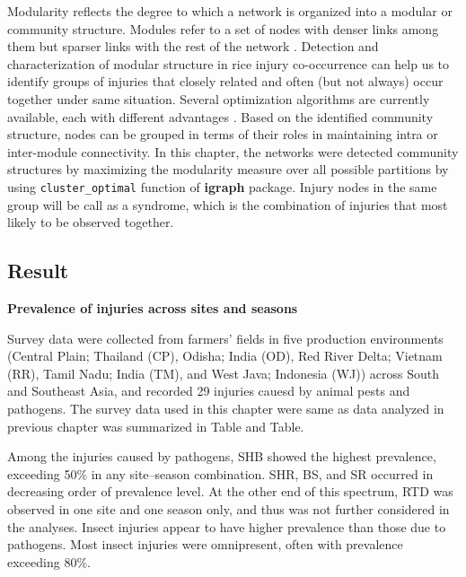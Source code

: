 Modularity reflects the degree to which a network is organized into a modular or community structure. Modules refer to a set of nodes with denser links among them but sparser links with the rest of the network \citep{Newman_2006_Modularity}. Detection and characterization of modular structure in rice injury co-occurrence can help us to identify groups of injuries that closely related and often (but not always) occur together under same situation. Several optimization algorithms are currently available, each with different advantages \citep{Brandes_2008_Modularity}. Based on the identified community structure, nodes can be grouped in terms of their roles in maintaining intra or inter-module connectivity. In this chapter, the networks were detected community structures by maximizing the modularity measure over all possible partitions by using \texttt{cluster\_optimal} function of \textbf{igraph} package. Injury nodes in the same group will be call as a syndrome, which is the combination of injuries that most likely to be observed together. 

\subsection{Result}

\textbf{Prevalence of injuries across sites and seasons}

Survey data were collected from farmers’ fields in five production environments (Central Plain; Thailand (CP), Odisha; India (OD), Red River Delta; Vietnam (RR), Tamil Nadu; India (TM), and West Java; Indonesia (WJ)) across South and Southeast Asia, and recorded 29 injuries cauesd by animal pests and pathogens.  The survey data used in this chapter were same as data analyzed in previous chapter was summarized in Table and Table.

Among the injuries caused by pathogens, SHB showed the highest prevalence, exceeding 50\% in any site–season combination. SHR, BS, and SR occurred in decreasing order of prevalence level. At the other end of this spectrum, RTD was observed in one site and one season only, and thus was not further considered in the analyses. Insect injuries appear to have higher prevalence than those due to pathogens. Most insect injuries were omnipresent, often with prevalence exceeding 80\%.

